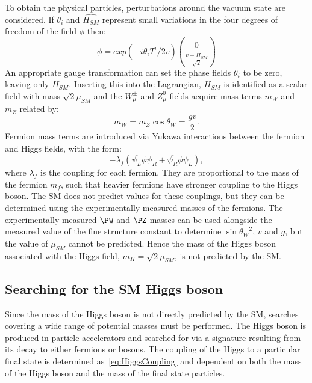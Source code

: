 To obtain the physical particles, perturbations around the vacuum state are
considered. If $\theta_{i}$ and $\hat{H_{SM}}$ represent small variations in the four
degrees of freedom of the field $\phi$ then:
\begin{equation}
\phi = exp(-i\theta_{i}T^{i}/2v)\left(\frac{0}{\frac{v+H_{SM}}{\sqrt{2}}} \right)
\end{equation}
An appropriate gauge transformation can set the phase fields $\theta_{i}$ to be
zero, leaving only $H_{SM}$. Inserting this into the Lagrangian, $H_{SM}$ is
identified as a scalar field with mass $\sqrt{2}\mu_{SM}$ and the $W_{\mu}^{\pm}$
and $Z_{\mu}^{0}$ fields acquire mass terms $m_{W}$ and $m_{Z}$ related by:
\begin{equation}
m_{W} = m_{Z}\cos{\theta_{W}}=\frac{gv}{2}.
\label{eq:vaccummw}
\end{equation}
Fermion mass terms are introduced via Yukawa interactions between the fermion
and Higgs fields, with the form:
\begin{equation}
-\lambda_{f}( \overline{\psi_{L}}\phi\psi_{R} +
\overline{\psi_{R}}\phi\psi_{L}),  
\label{eq:HiggsCoupling}
\end{equation}
where $\lambda_{f}$ is the coupling for each fermion. They are proportional to
the mass of the fermion $m_{f}$, such that heavier fermions have stronger
coupling to the Higgs boson. The \ac{SM} does not predict values for these
couplings, but they can be determined using the experimentally measured masses
of the fermions. The experimentally measured $\PW$ and $\PZ$ masses can be used
alongside the measured value of the fine structure constant to determine
$\sin{\theta_{W}}^{2}$, $v$ and $g$, but the value of $\mu_{SM}$ cannot be
predicted. Hence the mass of the Higgs boson associated with the Higgs field,
$m_{H}=\sqrt{2}\mu_{SM}$, is not predicted by the \ac{SM}.

\subsection{Searching for the SM Higgs boson}
\label{sec:LHCHiggs}

Since the mass of the Higgs boson is not directly predicted by the \ac{SM},
searches covering a wide range of potential masses must be performed.
The Higgs boson is produced in particle accelerators and searched for via a signature 
resulting from its decay to either fermions or bosons. The coupling of the
Higgs to a particular final state is determined as~\ref{eq:HiggsCoupling} and
dependent on both the mass of the Higgs boson and the mass of the final state
particles. 

